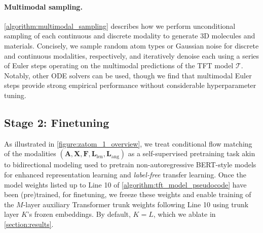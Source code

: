 \documentclass{article}
\theoremstyle{plain}
\theoremstyle{definition}
\theoremstyle{remark}
\begin{document}
\paragraph{Multimodal sampling.} \cref{algorithm:multimodal_sampling} describes how we perform unconditional sampling of each continuous and discrete modality to generate 3D molecules and materials. Concisely, we sample random atom types or Gaussian noise for discrete and continuous modalities, respectively, and iteratively denoise each using a series of Euler steps operating on the multimodal predictions of the TFT model $\mathcal{T}$. Notably, other ODE solvers can be used, though we find that multimodal Euler steps provide strong empirical performance without considerable hyperparameter tuning.

\subsection{Stage 2: Finetuning}
\label{subsection:finetuning}

As illustrated in \cref{figure:zatom_1_overview}, we treat conditional flow matching of the modalities $\left(\bm{A}, \bm{X}, \bm{F}, \bm{L}_\text{len}, \bm{L}_\text{ang}\right)$ as a self-supervised pretraining task akin to bidirectional modeling used to pretrain non-autoregressive BERT-style models \citep{devlin2019bert} for enhanced representation learning \citep{zhang2025diffusion} and \textit{label-free} transfer learning. Once the model weights listed up to Line 10 of \cref{algorithm:tft_model_pseudocode} have been (pre)trained, for finetuning, we freeze these weights and enable training of the $M$-layer auxiliary Transformer trunk weights following Line 10 using trunk layer $K$'s frozen embeddings. By default, $K=L$, which we ablate in \cref{section:results}.
\end{document}
